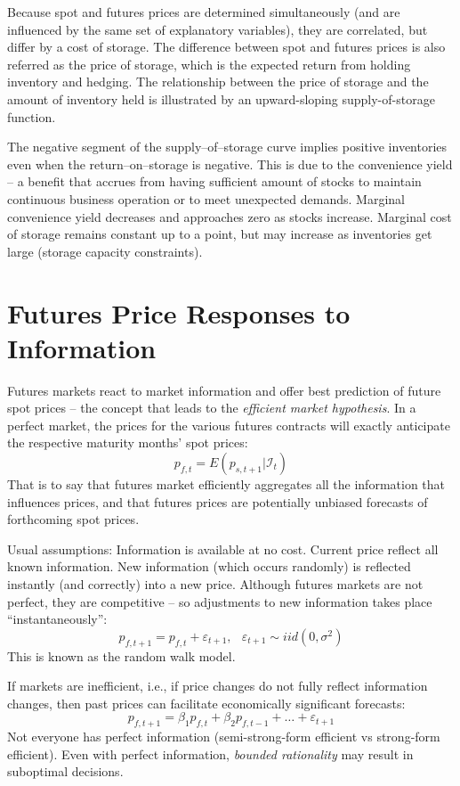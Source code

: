 \documentclass[]{book}
\begin{document}
Because spot and futures prices are determined simultaneously (and are
influenced by the same set of explanatory variables), they are
correlated, but differ by a cost of storage. The difference between spot
and futures prices is also referred as the price of storage, which is
the expected return from holding inventory and hedging. The relationship
between the price of storage and the amount of inventory held is
illustrated by an upward-sloping supply-of-storage function.

The negative segment of the supply--of--storage curve implies positive
inventories even when the return--on--storage is negative. This is due
to the convenience yield -- a benefit that accrues from having
sufficient amount of stocks to maintain continuous business operation or
to meet unexpected demands. Marginal convenience yield decreases and
approaches zero as stocks increase. Marginal cost of storage remains
constant up to a point, but may increase as inventories get large
(storage capacity constraints).

\section{Futures Price Responses to
Information}\label{futures-price-responses-to-information}

Futures markets react to market information and offer best prediction of
future spot prices -- the concept that leads to the
\textit{efficient market hypothesis}. In a perfect market, the prices
for the various futures contracts will exactly anticipate the respective
maturity months' spot prices:
\[p_{f,t} = E\!\left(p_{s,t+1}|\mathcal{I}_t\right)\] That is to say
that futures market efficiently aggregates all the information that
influences prices, and that futures prices are potentially unbiased
forecasts of forthcoming spot prices.

Usual assumptions: Information is available at no cost. Current price
reflect all known information. New information (which occurs randomly)
is reflected instantly (and correctly) into a new price. Although
futures markets are not perfect, they are competitive -- so adjustments
to new information takes place ``instantaneously'':
\[p_{f,t+1} = p_{f,t} + \varepsilon_{t+1},\;~~\varepsilon_{t+1}\sim iid\left(0,\sigma^2\right)\]
This is known as the random walk model.

If markets are inefficient, i.e., if price changes do not fully reflect
information changes, then past prices can facilitate economically
significant forecasts:
\[p_{f,t+1} = \beta_1 p_{f,t} + \beta_2 p_{f,t-1} + \ldots + \varepsilon_{t+1}\]
Not everyone has perfect information (semi-strong-form efficient vs
strong-form efficient). Even with perfect information,
\textit{bounded rationality} may result in suboptimal decisions.
\end{document}
